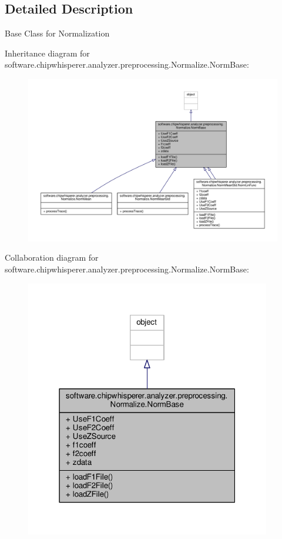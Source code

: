 \subsection{Detailed Description}
\begin{DoxyVerb}Base Class for Normalization\end{DoxyVerb}
 

Inheritance diagram for software.\+chipwhisperer.\+analyzer.\+preprocessing.\+Normalize.\+Norm\+Base\+:\nopagebreak
\begin{figure}[H]
\begin{center}
\leavevmode
\includegraphics[width=350pt]{d7/d07/classsoftware_1_1chipwhisperer_1_1analyzer_1_1preprocessing_1_1Normalize_1_1NormBase__inherit__graph}
\end{center}
\end{figure}


Collaboration diagram for software.\+chipwhisperer.\+analyzer.\+preprocessing.\+Normalize.\+Norm\+Base\+:\nopagebreak
\begin{figure}[H]
\begin{center}
\leavevmode
\includegraphics[width=304pt]{df/d98/classsoftware_1_1chipwhisperer_1_1analyzer_1_1preprocessing_1_1Normalize_1_1NormBase__coll__graph}
\end{center}
\end{figure}


